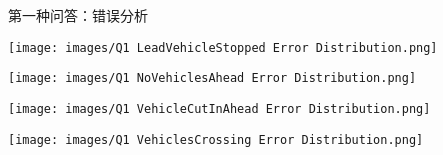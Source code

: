 \documentclass[serif]{beamer}
\begin{document}
\begin{frame}{第一种问答：错误分析}

\begin{minipage}[t]{0.4\textwidth}
  \centering
  \texttt{[image: images/Q1 LeadVehicleStopped Error Distribution.png]}
\end{minipage}
\hfill
\begin{minipage}[t]{0.4\textwidth}
  \centering
  \texttt{[image: images/Q1 NoVehiclesAhead Error Distribution.png]}
\end{minipage}


\begin{minipage}[t]{0.4\textwidth}
  \centering
  \texttt{[image: images/Q1 VehicleCutInAhead Error Distribution.png]}
\end{minipage}
\hfill
\begin{minipage}[t]{0.4\textwidth}
  \centering
  \texttt{[image: images/Q1 VehiclesCrossing Error Distribution.png]}
\end{minipage}


\end{frame}
\end{document}
